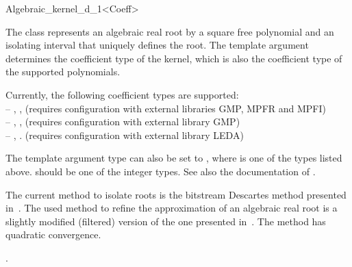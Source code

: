 \begin{ccRefClass}{Algebraic_kernel_d_1<Coeff>}


\ccDefinition

The class represents an algebraic real root by a square free polynomial and an
isolating interval that uniquely defines the root.
The template argument  determines the coefficient type of the 
kernel, which is also the coefficient type of the supported polynomials.  

Currently, the following coefficient types are supported:\\
-- , , (requires configuration with external libraries GMP, MPFR and MPFI)\\
-- , , (requires configuration with external library GMP) \\ 
-- , . (requires configuration with external library LEDA)\\

\begin{ccAdvanced}
The template argument type can also be set to , where  is 
one of the types listed above.  should be one of the integer types. 
See also the documentation of . 
\end{ccAdvanced}

 The current method 
to isolate roots is the bitstream Descartes method presented in~\cite{eigenwillig-phd-08}.
The used method to refine the approximation of an algebraic real root is a slightly modified 
(filtered) version of the one presented in~\cite{abbott-qir-06}. 
The method has quadratic convergence.

\ccIsModel
{}.


\ccTypes \ccThree{}{+++++++++++++}{++++++++}








\ccSeeAlso
{}\\
\\

\end{ccRefClass}
